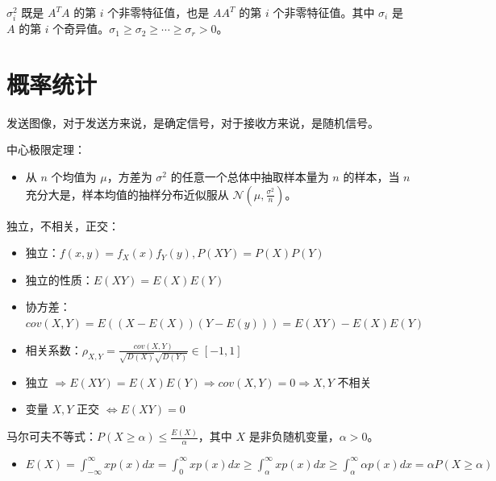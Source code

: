 \begin{remark}
    $\sigma_i^2$ 既是 $A^TA$ 的第 $i$ 个非零特征值，也是 $AA^T$ 的第 $i$ 个非零特征值。其中 $\sigma_i$ 是 $A$ 的第 $i$ 个奇异值。$\sigma_1 \ge \sigma_2 \ge \cdots \ge \sigma_r > 0$。
\end{remark}

\section{概率统计}
\begin{remark}
    发送图像，对于发送方来说，是确定信号，对于接收方来说，是随机信号。
\end{remark}

\begin{remark}
    中心极限定理：
    \begin{itemize}
        \item 从 $n$ 个均值为 $\mu$，方差为 $\sigma^2$ 的任意一个总体中抽取样本量为 $n$ 的样本，当 $n$ 充分大是，样本均值的抽样分布近似服从 $\mathcal{N}(\mu, \frac{\sigma^2}{n})$。
    \end{itemize}
\end{remark}

\begin{remark}
    独立，不相关，正交：
    \begin{itemize}
        \item 独立：$f(x, y) = f_X(x)f_Y(y), P(XY) = P(X)P(Y)$
        \item 独立的性质：$E(XY) = E(X)E(Y)$
        \item 协方差：$cov(X, Y) = E((X - E(X))(Y - E(y))) = E(XY) - E(X)E(Y)$
        \item 相关系数：$\rho_{X, Y} = \frac{cov(X, Y)}{\sqrt{D(X)}\sqrt{D(Y)}} \in \left[-1, 1\right]$
        \item 独立 $\Rightarrow E(XY) = E(X)E(Y) \Rightarrow cov(X, Y) = 0 \Rightarrow X, Y$ 不相关 
        \item 变量 $X,Y$ 正交 $\Leftrightarrow E(XY) = 0$
    \end{itemize}
\end{remark}

\begin{remark}
    马尔可夫不等式：$P(X \ge \alpha) \le \frac{E(X)}{\alpha}$，其中 $X$ 是非负随机变量，$\alpha > 0$。 
    \begin{itemize}
        \item $E(X) = \int_{-\infty}^{\infty}xp(x)dx = \int_{0}^{\infty}xp(x)dx \ge \int_{\alpha}^{\infty}xp(x)dx \ge \int_{\alpha}^{\infty}\alpha p(x)dx = \alpha P(X \ge \alpha)$
    \end{itemize}
\end{remark}


